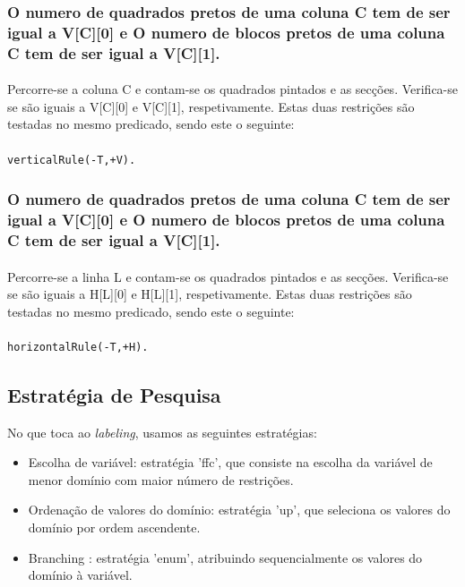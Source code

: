 \documentclass[runningheads,a4paper]{llncs}
\begin{document}
\subsubsection{O numero de quadrados pretos de uma coluna C tem de ser igual a V[C][0] e O numero de blocos pretos de uma coluna C tem de ser igual a V[C][1].}
\paragraph{}
Percorre-se a coluna C e contam-se os quadrados pintados e as secções. Verifica-se se são iguais a V[C][0] e V[C][1], respetivamente.
Estas duas restrições são testadas no mesmo predicado, sendo este o seguinte:
\paragraph{}
\begin{lstlisting}
verticalRule(-T,+V).
\end{lstlisting}

\subsubsection{O numero de quadrados pretos de uma coluna C tem de ser igual a V[C][0] e O numero de blocos pretos de uma coluna C tem de ser igual a V[C][1].}
\paragraph{}
Percorre-se a linha L e contam-se os quadrados pintados e as secções. Verifica-se se são iguais a H[L][0] e H[L][1], respetivamente.
Estas duas restrições são testadas no mesmo predicado, sendo este o seguinte:
\paragraph{}
\begin{lstlisting}
horizontalRule(-T,+H).
\end{lstlisting}

\subsection{Estratégia de Pesquisa}

No que toca ao \textit{labeling}, usamos as seguintes estratégias:

\begin{itemize}
\item Escolha de variável:  estratégia 'ffc', que consiste na escolha da variável de menor domínio com maior número de restrições.
\item Ordenação de valores do domínio: estratégia 'up', que seleciona os valores do domínio por ordem ascendente.
\item Branching : estratégia 'enum', atribuindo sequencialmente os valores do domínio à variável.
\end{itemize}
\end{document}
